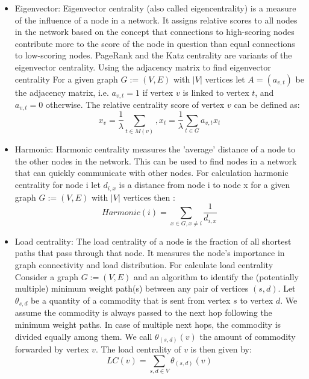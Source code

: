 \documentclass[conference]{IEEEtran}
\begin{document}
\begin{itemize}
    The damping factor $\alpha$ and the personalization vector $\beta$ have the same role seen for Katz centrality.
     In particular, $\alpha$ should be chosen between $0$ and $1 / \rho(D^{-1}A)$. Also, when the network is large,
      it is preferable to use the power method for the computation of PageRank.
    \item Eigenvector: Eigenvector centrality (also called eigencentrality) is a measure of the influence of a node 
    in a network. It assigns relative scores to all nodes in the network based on the concept that connections to
     high-scoring nodes contribute more to the score of the node in question than equal connections to low-scoring nodes. 
     PageRank and the Katz centrality are variants of the eigenvector centrality. Using the adjacency matrix to find 
      eigenvector centrality For a given graph $G := (V,E)$ with $|V|$ vertices let $A = (a_{v,t})$ be the adjacency matrix, i.e.
     $a_{v,t} = 1$ if vertex $v$ is linked to vertex $t$, and $a_{v,t} = 0 $ otherwise. The relative centrality score of vertex $v$ can be defined as:
     $$ x_{v} = \frac{1}{\lambda}\sum_{t\in M(v)}, x_{t} =\frac{1}{\lambda} \sum_{t\in G} a_{v,t}x_t $$
    \item Harmonic: Harmonic centrality measures the 'average' distance of a node to the other nodes in the network. 
    This can be used to find nodes in a network that can quickly communicate with other nodes.
    For calculation harmonic centrality for node i let $d_{i,x}$ is a distance from node i to node x for a given graph $G := (V,E)$ with $|V|$ vertices then :
    $$ Harmonic(i) = \sum_{x\in G , x \neq i } \frac{1}{d_{i,x}}$$
    \item Load centrality: The load centrality of a node is the fraction of all shortest paths that pass through that node. It 
     measures the node's importance in graph connectivity and load distribution. For calculate load centrality  Consider a graph $G := (V,E)$ and an
     algorithm to identify the (potentially multiple) minimum weight
     path(s) between any pair of vertices $(s, d)$. Let $\theta_{s,d}$ be a quantity
     of a commodity that is sent from vertex $s$ to vertex $d$. We
     assume the commodity is always passed to the next hop following
     the minimum weight paths. In case of multiple next hops, the
     commodity is divided equally among them. We call $\theta_{(s,d)}(v)$ the
     amount of commodity forwarded by vertex $v$. The load centrality
     of $v$ is then given by:
     $$LC(v) = \sum_{s,d \in V} \theta_{(s,d)}(v)$$
\end{itemize}
\end{document}
